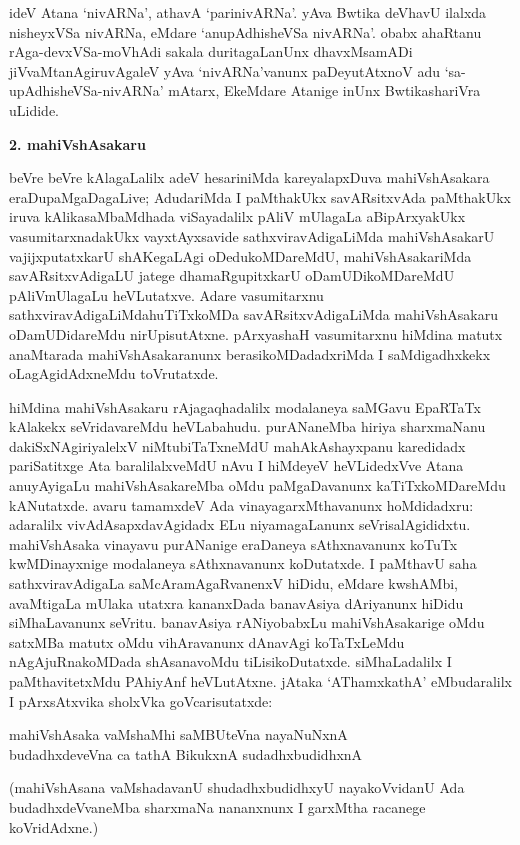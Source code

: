 ideV Atana `nivARNa', athavA `parinivARNa'. yAva Bwtika deVhavU ilalxda nisheyxVSa nivARNa, eMdare `anupAdhisheVSa nivARNa'. obabx ahaRtanu rAga-devxVSa-moVhAdi sakala duritagaLanUnx dhavxMsamADi jiVvaMtanAgiruvAgaleV yAva `nivARNa'vanunx paDeyutAtxnoV adu `sa-upAdhisheVSa-nivARNa' mAtarx, EkeMdare Atanige inUnx BwtikashariVra uLidide.

\medskip

\begin{center}
{\textbf{\Large 2. mahiVshAsakaru}}
\end{center}

beVre beVre kAlagaLalilx adeV hesariniMda kareyalapxDuva mahiVshAsakara eraDu\break paMgaDa\-gaLive; AdudariMda I paMthakUkx savARsitxvAda paMthakUkx iruva kAlika\break saMbaMdhada viSayadalilx pAliV mUlagaLa aBipArxyakUkx vasumitarxnadakUkx vayxtAyxsa\-vide sathxviravAdigaLiMda mahiVshAsakarU vajijxputatxkarU shAKegaLAgi oDedukoMDa\break\-reMdU, mahiVshAsakariMda savARsitxvAdigaLU jatege dhamaRgupitxkarU oDamUDi\break\-koMDareMdU pAliVmUlagaLu heVLutatxve. Adare vasumitarxnu sathxviravAdigaLiMda\break huTiTxkoMDa savARsitxvAdigaLiMda mahiVshAsakaru oDamUDidareMdu nirUpisutAtxne. pArxyashaH vasumitarxnu hiMdina matutx anaMtarada mahiVshAsakaranunx berasikoMDadadx\-riMda I saMdigadhxkekx oLagAgidAdxneMdu toVrutatxde.

hiMdina mahiVshAsakaru rAjagaqhadalilx modalaneya saMGavu EpaRTaTx kAlakekx seVridavareMdu heVLabahudu. purANaneMba hiriya sharxmaNanu dakiSxNAgiriyalelxV niMtubiTaTxneMdU mahAkAshayxpanu karedidadx pariSatitxge Ata baralilalxveMdU nAvu I hiMdeyeV heVLidedxVve Atana anuyAyigaLu mahiVshAsakareMba oMdu paMgaDavanunx kaTiTxkoMDareMdu kANutatxde. avaru tamamxdeV Ada vinayagarxMthavanunx hoMdidadxru: adaralilx vivAdAsapxdavAgidadx ELu niyamagaLanunx seVrisalAgididxtu. mahiVshAsaka vinayavu purANanige eraDaneya sAthxnavanunx koTuTx kwMDinayxnige modalaneya sAthxnavanunx koDutatxde. I paMthavU saha sathxviravAdigaLa saMcAramAgaRvanenxV hiDidu, eMdare kwshAMbi, avaMtigaLa mUlaka utatxra kananxDada banavAsiya dAriyanunx hiDidu siMhaLavanunx seVritu. banavAsiya rANiyobabxLu mahiVshAsakarige oMdu satxMBa matutx oMdu vihAravanunx dAnavAgi koTaTxLeMdu nAgAjuRnakoMDada shAsanavoMdu tiLisikoDutatxde. siMhaLadalilx I paMthavitetxMdu PAhiyAnf heVLutAtxne. jAtaka `AThamxkathA' eMbudaralilx I pArxsAtxvika sholxVka goVcarisutatxde:

\begin{center}
mahiVshAsaka vaMshaMhi saMBUteVna nayaNuNxnA\\
budadhxdeveVna ca tathA BikukxnA sudadhxbudidhxnA
\end{center}
(mahiVshAsana vaMshadavanU shudadhxbudidhxyU nayakoVvidanU Ada budadhxdeVvaneMba sharxmaNa nananxnunx I garxMtha racanege koVridAdxne.)

